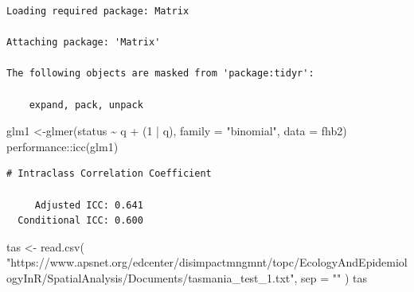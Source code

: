 \documentclass[
  letterpaper,
  DIV=11,
  numbers=noendperiod]{scrreprt}
\newenvironment{Shaded}{\begin{snugshade}}{\end{snugshade}}
\newcommand{\AttributeTok}[1]{\textcolor[rgb]{0.40,0.45,0.13}{#1}}
\newcommand{\DecValTok}[1]{\textcolor[rgb]{0.68,0.00,0.00}{#1}}
\newcommand{\FunctionTok}[1]{\textcolor[rgb]{0.28,0.35,0.67}{#1}}
\newcommand{\NormalTok}[1]{\textcolor[rgb]{0.00,0.23,0.31}{#1}}
\newcommand{\OtherTok}[1]{\textcolor[rgb]{0.00,0.23,0.31}{#1}}
\newcommand{\SpecialCharTok}[1]{\textcolor[rgb]{0.37,0.37,0.37}{#1}}
\newcommand{\StringTok}[1]{\textcolor[rgb]{0.13,0.47,0.30}{#1}}
\begin{document}
\begin{verbatim}
Loading required package: Matrix

Attaching package: 'Matrix'

The following objects are masked from 'package:tidyr':

    expand, pack, unpack
\end{verbatim}

\begin{Shaded}
\begin{Highlighting}[]
\NormalTok{glm1 }\OtherTok{\textless{}{-}}\FunctionTok{glmer}\NormalTok{(status }\SpecialCharTok{\textasciitilde{}}\NormalTok{ q }\SpecialCharTok{+}\NormalTok{ (}\DecValTok{1} \SpecialCharTok{|}\NormalTok{ q), }\AttributeTok{family =} \StringTok{"binomial"}\NormalTok{, }\AttributeTok{data =}\NormalTok{ fhb2)}
\NormalTok{performance}\SpecialCharTok{::}\FunctionTok{icc}\NormalTok{(glm1)}
\end{Highlighting}
\end{Shaded}

\begin{verbatim}
# Intraclass Correlation Coefficient

     Adjusted ICC: 0.641
  Conditional ICC: 0.600
\end{verbatim}

\begin{Shaded}
\begin{Highlighting}[]
\NormalTok{tas }\OtherTok{\textless{}{-}}
  \FunctionTok{read.csv}\NormalTok{(}
    \StringTok{"https://www.apsnet.org/edcenter/disimpactmngmnt/topc/EcologyAndEpidemiologyInR/SpatialAnalysis/Documents/tasmania\_test\_1.txt"}\NormalTok{,}
    \AttributeTok{sep =} \StringTok{""}
\NormalTok{  )}
\NormalTok{tas}
\end{Highlighting}
\end{Shaded}
\end{document}
